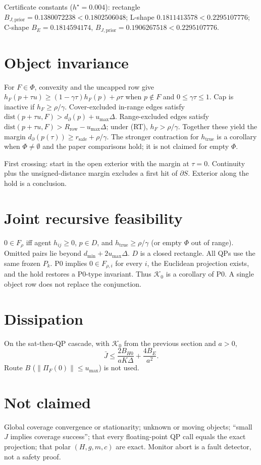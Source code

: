 \documentclass{article}
\begin{document}
Certificate constants (\(h^\star=0.004\)): rectangle
\(B_{J,\mathrm{prior}}=0.1380072238<0.1802506048\);
L-shape \(0.1811413578<0.2295107776\);
C-shape \(B_E=0.1814594174\), \(B_{J,\mathrm{prior}}=0.1906267518<0.2295107776\).

\section{Object invariance}
For \(F\in\Phi\), convexity and the uncapped row give
\(h_F(p+\tau u)\ge(1-\gamma\tau)h_F(p)+\rho\tau\) when \(p\notin F\) and \(0\le\gamma\tau\le 1\).
Cap is inactive if \(h_F\ge\rho/\gamma\).
Cover-excluded in-range edges satisfy \(\mathrm{dist}(p+\tau u,F)>d_\partial(p)+u_{\max}\Delta\).
Range-excluded edges satisfy \(\mathrm{dist}(p+\tau u,F)>R_{\mathrm{row}}-u_{\max}\Delta\); under (RT), \(h_F>\rho/\gamma\).
Together these yield the margin \(d_\partial(p(\tau))\ge r_{\mathrm{safe}}+\rho/\gamma\).
The stronger contraction for \(h_{\mathrm{true}}\) is a corollary when \(\Phi\neq\emptyset\) and the paper comparisons hold; it is not claimed for empty \(\Phi\).

First crossing: start in the open exterior with the margin at \(\tau=0\). Continuity plus the unsigned-distance margin excludes a first hit of \(\partial S\). Exterior along the hold is a conclusion.

\section{Joint recursive feasibility}
\(0\in F_\rho\) iff agent \(h_{ij}\ge 0\), \(p\in D\), and \(h_{\mathrm{true}}\ge\rho/\gamma\) (or empty \(\Phi\) out of range).
Omitted pairs lie beyond \(d_{\min}+2u_{\max}\Delta\). \(D\) is a closed rectangle.
All QPs use the same frozen \(P_k\). P0 implies \(0\in F_{\rho,i}\) for every \(i\), the Euclidean projection exists, and the hold restores a P0-type invariant.
Thus \(\mathcal K_0\) is a corollary of P0. A single object row does not replace the conjunction.

\section{Dissipation}
On the sat-then-QP cascade, with \(\mathcal K_0\) from the previous section and \(a>0\),
\[
\bar J\le \frac{2B_{H0}}{aK\Delta}+\frac{4B_E}{a^2}.
\]
Route \(B\) (\(\|\Pi_F(0)\|\le u_{\max}\)) is not used.

\section{Not claimed}
Global coverage convergence or stationarity; unknown or moving objects; ``small \(J\) implies coverage success''; that every floating-point QP call equals the exact projection; that polar \((H,g,m,c)\) are exact. Monitor abort is a fault detector, not a safety proof.
\end{document}

